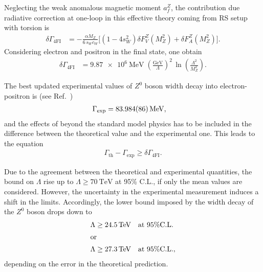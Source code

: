 \documentclass[twocolumn,showpacs,showkeys,prd,superscriptaddress]{revtex4-1}
\begin{document}
Neglecting the weak anomalous magnetic moment $a_f^Z$, the contribution due radiative correction at one-loop in this effective theory coming from RS setup with torsion is
\begin{align}
  \delta\Gamma_{\text{4FI}} &= -\frac{\alpha M_Z}{6\,s_Wc_W}\Bigg[(1 - 4s_W^2)\delta F_V^Z(M_Z^2) + \delta F_A^Z(M_Z^2)\Bigg].
\end{align}
Considering electron and positron in the final state, one obtain %
\begin{align}
  \label{deltagammateo}
  \delta\Gamma_{\text{4FI}} &= \SI{9.87e6}{\MeV}\;\left(\frac{\si{\GeV}}{\Lambda}\right)^2\,\ln\left(\frac{\Lambda^2}{M_Z^2}\right).
\end{align}

The best updated experimental values of $Z^0$ boson width decay into electron-positron is (see  Ref.~\cite{Beringer:1900zz})
\begin{align}
  \label{deltagammaexp}
  \Gamma_{\text{exp}} &= \SI{83.984 \pm 0.086}{\MeV} ,
\end{align}
and the effects of beyond the standard model physics has to be included in the difference between the theoretical value and the experimental one. This leads to the equation 
\begin{align}
  \Gamma_{\text{th}} - \Gamma_{\text{exp}}\geq \delta\Gamma_{\text{4FI}}.
\end{align}

Due to the agreement between the theoretical and experimental quantities, the bound on $\Lambda$ rise up to \mbox{$\Lambda \ge \SI{70}{\TeV}$} at 95\% C.L., if only the mean values are considered. However,  the uncertainty in the experimental measurement induces a shift in the limits. Accordingly, the lower bound imposed by the width decay of the $Z^0$ boson drops down to
\begin{align}
  \Lambda &\ge \SI{24.5}{\TeV}\quad \text{at 95\%C.L.}\\
  \intertext{or}
  \Lambda &\ge \SI{27.3}{\TeV}\quad \text{at 95\%C.L.},
\end{align}
depending on the error in the theoretical prediction.
\end{document}
